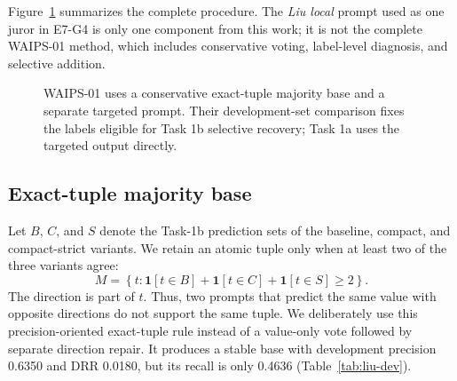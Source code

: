 \documentclass[sigconf,article,a4paper]{acmart}
\begin{document}
Figure~\ref{fig:liu-pipeline} summarizes the complete procedure. The
\emph{Liu local} prompt used as one juror in E7-G4 is only one component from
this work; it is not the complete WAIPS-01 method, which includes conservative
voting, label-level diagnosis, and selective addition.

\begin{figure}[t]
  \centering
  \caption{WAIPS-01 uses a conservative exact-tuple majority base and a
  separate targeted prompt. Their development-set comparison fixes the labels
  eligible for Task 1b selective recovery; Task 1a uses the targeted output
  directly.}
  \label{fig:liu-pipeline}
\end{figure}

\subsection{Exact-tuple majority base}

Let $B$, $C$, and $S$ denote the Task-1b prediction sets of the baseline,
compact, and compact-strict variants. We retain an atomic tuple only when at
least two of the three variants agree:
\begin{equation}
 M=\left\{t:\mathbf{1}[t\in B]+\mathbf{1}[t\in C]+\mathbf{1}[t\in S]\geq2\right\}.
 \label{eq:liu-majority}
\end{equation}
The direction is part of $t$. Thus, two prompts that predict the same value
with opposite directions do not support the same tuple. We deliberately use
this precision-oriented exact-tuple rule instead of a value-only vote followed
by separate direction repair. It produces a stable base with development precision 0.6350
and DRR 0.0180, but its recall is only 0.4636 (Table~\ref{tab:liu-dev}).
\end{document}
